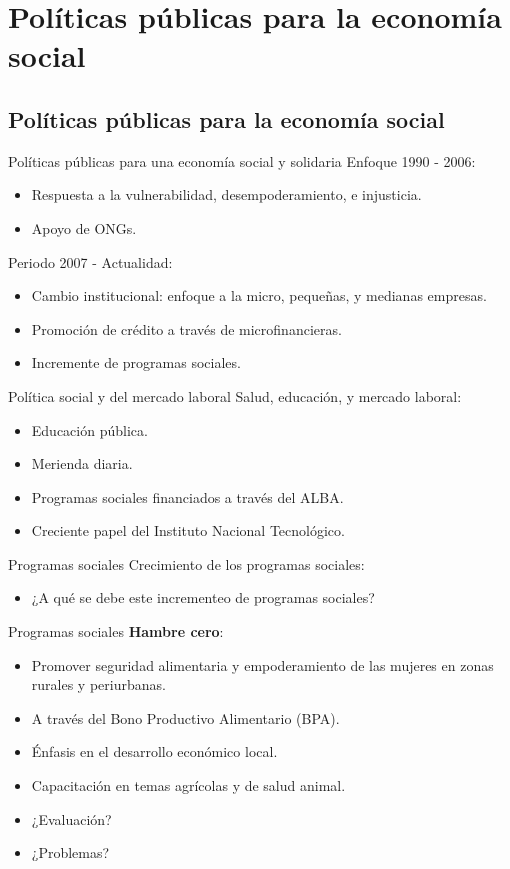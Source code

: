 \documentclass[11pt, aspectratio=169, compress]{beamer}
\begin{document}
\section{Políticas públicas para la economía social}
\subsection{Políticas públicas para la economía social}
\begin{frame}{Políticas públicas para una economía social y solidaria}
Enfoque 1990 - 2006: 
\begin{itemize}
	\item Respuesta a la vulnerabilidad, desempoderamiento, e injusticia. 
	\item Apoyo de ONGs. 
\end{itemize}
Periodo 2007 - Actualidad: 
\begin{itemize}
	\item Cambio institucional: enfoque a la micro, pequeñas, y medianas empresas. 
	\item Promoción de crédito a través de microfinancieras. 
	\item Incremente de programas sociales. 
\end{itemize}
\end{frame}
\begin{frame}{Política social y del mercado laboral}
Salud, educación, y mercado laboral:
\begin{itemize}
	\item Educación pública. 
	\item Merienda diaria. 
	\item Programas sociales financiados a través del ALBA. 
	\item Creciente papel del Instituto Nacional Tecnológico. 
\end{itemize}	
\end{frame}
\begin{frame}{Programas sociales}
Crecimiento de los programas sociales:
\begin{itemize}
	\item ¿A qué se debe este incrementeo de programas sociales? 
\end{itemize}
\end{frame}
\begin{frame}[t]{Programas sociales}
\textbf{Hambre cero}:
\begin{itemize}
	\item Promover seguridad alimentaria y empoderamiento de las mujeres en zonas rurales y periurbanas. 
	\item A través del Bono Productivo Alimentario (BPA). 
	\item Énfasis en el desarrollo económico local. 
	\item Capacitación en temas agrícolas y de salud animal. 
	\item ¿Evaluación? 
	\item ¿Problemas? 
\end{itemize}
\end{frame}
\end{document}
